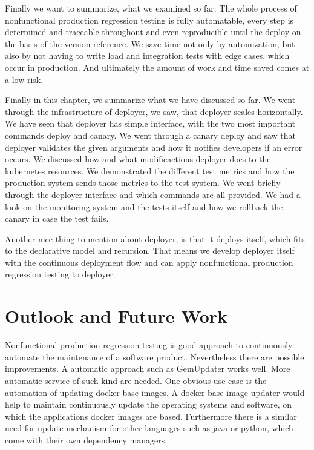 Finally we want to summarize, what we examined so far: The whole process of nonfunctional
production regression testing is fully automatable, every step is determined and traceable
throughout and even reproducible until the deploy on the basis of the version
reference. We save time not only by automization, but also by not having to write load and
integration tests with edge cases, which occur in production. And ultimately the amount of
work and time saved comes at a low risk.


Finally in this chapter, we summarize what we have discussed so far. We went through the
infrastructure of deployer, we saw, that deployer scales horizontally. We have seen that
deployer has simple interface, with the two most important commands deploy and canary. We
went through a canary deploy and saw that deployer validates the given arguments and how
it notifies developers if an error occurs. We discussed how and what modificactions
deployer does to the kubernetes resources. We demonstrated the different test metrics and
how the production system sends those metrics to the test system. We went briefly through
the deployer interface and which commands are all provided. We had a look on the
monitoring system and the tests itself and how we rollback the canary in case the test
fails.

Another nice thing to mention about deployer, is that it deploys itself, which fits to the
declarative model and recursion. That means we develop deployer itself with the continuous
deployment flow and can apply nonfunctional production regression testing to deployer.



\section{Outlook and Future Work}

Nonfunctional production regression testing is good approach to continuously automate the
maintenance of a software product. Nevertheless there are possible improvements. A
automatic approach such as GemUpdater works well. More automatic service of such kind are
needed. One obvious use case is the automation of updating docker base images. A docker
base image updater would help to maintain continuously update the operating systems and
software, on which the applications docker images are based. Furthermore there is a
similar need for update mechanism for other languages such as java or python, which come
with their own dependency managers.

